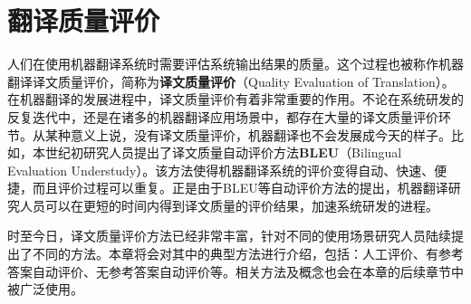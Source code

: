 
%


\renewcommand\figurename{图}%
\renewcommand\tablename{表}%


\chapter{翻译质量评价}

\parinterval 人们在使用机器翻译系统时需要评估系统输出结果的质量。这个过程也被称作机器翻译译文质量评价，简称为{\small\sffamily\bfseries{译文质量评价}}（Quality Evaluation of Translation）。在机器翻译的发展进程中，译文质量评价有着非常重要的作用。不论在系统研发的反复迭代中，还是在诸多的机器翻译应用场景中，都存在大量的译文质量评价环节。从某种意义上说，没有译文质量评价，机器翻译也不会发展成今天的样子。比如，本世纪初研究人员提出了译文质量自动评价方法{\small\sffamily\bfseries{BLEU}}（Bilingual Evaluation Understudy）。该方法使得机器翻译系统的评价变得自动、快速、便捷，而且评价过程可以重复。正是由于BLEU等自动评价方法的提出，机器翻译研究人员可以在更短的时间内得到译文质量的评价结果，加速系统研发的进程。

\parinterval 时至今日，译文质量评价方法已经非常丰富，针对不同的使用场景研究人员陆续提出了不同的方法。本章将会对其中的典型方法进行介绍，包括：人工评价、有参考答案自动评价、无参考答案自动评价等。相关方法及概念也会在本章的后续章节中被广泛使用。


